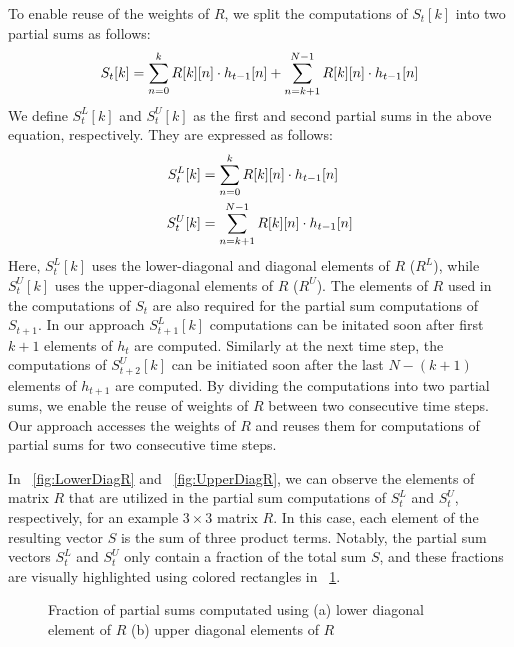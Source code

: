 To enable reuse of the weights of $R$, we split the computations of $S_{t}[k]$ into two partial sums as follows:
\begin{align}\label{eq:S_{t}_split}
	S_{t}[k] = \sum_{n=0}^{k}R[k][n]\cdot h_{t-1}[n] + \sum_{n=k+1}^{N-1}R[k][n]\cdot h_{t-1}[n]
\end{align}
We define $S_{t}^{L}[k]$ and $S_{t}^{U}[k]$ as the first and second partial sums in the above equation, respectively. They are expressed as follows: 
\begin{align}
	S_{t}^{L}[k] &= \sum_{n=0}^{k}R[k][n]\cdot h_{t-1}[n] \label{eq:S_L_{t}}\\
	S_{t}^{U}[k] &= \sum_{n=k{+}1}^{N-1}R[k][n]\cdot h_{t-1}[n] \label{eq:S_U_{t}}
\end{align}
Here, $S_{t}^{L}[k]$ uses the lower-diagonal and diagonal elements of $R$ ($R^L$), while $S_{t}^{U}[k]$ uses the upper-diagonal elements of $R$ ($R^U$). The elements of $R$ used in the computations of $S_{t}$ are also required for the partial sum computations of $S_{t+1}$.
In our approach $S_{t{+}1}^{L}[k]$ computations can be initated soon after first $k{+}1$ elements of $h_{t}$ are computed. Similarly at the next time step, the computations of $S^U_{t{+}2}[k]$ can be initiated soon after the last $N{-}(k{+}1)$ elements of $h_{t{+}1}$ are computed. By dividing the computations into two partial sums, we enable the reuse of weights of $R$ between two consecutive time steps. Our approach accesses the weights of $R$ and reuses them for computations of partial sums for two consecutive time steps.

In \figurename{~\ref{fig:LowerDiagR}} and \figurename{~\ref{fig:UpperDiagR}}, we can observe the elements of matrix $R$ that are utilized in the partial sum computations of $S_{t}^{L}$ and $S_{t}^{U}$, respectively, for an example $3\times3$ matrix $R$. In this case, each element of the resulting vector $S$ is the sum of three product terms. Notably, the partial sum vectors $S^L_t$ and $S^U_t$ only contain a fraction of the total sum $S$, and these fractions are visually highlighted using colored rectangles in \figurename{~\ref{fig:partialSumComputations}}.

\begin{figure}[htb!]
	\centering
	\hspace{2.0em}
	\caption{Fraction of partial sums computated using (a) lower diagonal element of $R$  (b) upper diagonal elements of $R$ }
	\label{fig:partialSumComputations}
\end{figure}

